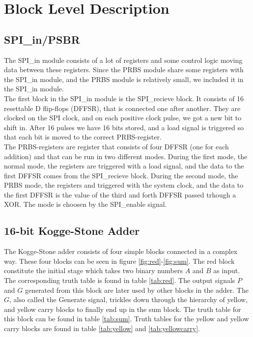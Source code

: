 \section{Block Level Description}

\subsection{SPI\_in/PSBR}
The SPI\_in module consists of a lot of registers and some control logic moving data between these registers. Since the PRBS module share some registers with the SPI\_in module, and the PRBS module is relatively small, we included it in the SPI\_in module. \\
The first block in the SPI\_in module is the SPI\_recieve block. It consists of 16 resettable D flip-flops (DFFSR), that is connected one after another. They are clocked on the SPI clock, and on each positive clock pulse, we got a new bit to shift in. After 16 pulses we have 16 bits stored, and a load signal is triggered so that each bit is moved to the correct PRBS-register. \\
The PRBS-registers are register that consists of four DFFSR (one for each addition) and that can be run in two different modes. During the first mode, the normal mode, the registers are triggered with a load signal, and the data to the first DFFSR comes from the SPI\_recieve block. During the second mode, the PRBS mode, the registers and triggered with the system clock, and the data to the first DFFSR is the value of the third and forth DFFSR passed trhough a XOR. The mode is choosen by the SPI\_enable signal.
\subsection{16-bit Kogge-Stone Adder}
The Kogge-Stone adder consists of four simple blocks connected in a complex way. These four blocks can be seen in figure \ref{fig:red}-\ref{fig:sum}. The red block constitute the initial stage which takes two binary numbers $A$ and $B$ as input. The corresponding truth table is found in table \ref{tab:red}. The output signals $P$ and $G$ generated from this block are later used by other blocks in the adder. The $G$, also called the Generate signal, trickles down through the hierarchy of yellow, and yellow carry blocks to finally end up in the sum block. The truth table for this block can be found in table \ref{tab:sum}. Truth tables for the yellow and yellow carry blocks are found in table \ref{tab:yellow} and \ref{tab:yellowcarry}.

